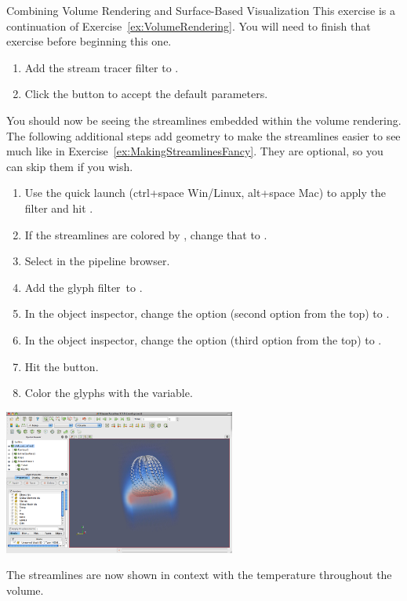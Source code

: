 \begin{exercise}{Combining Volume Rendering and Surface-Based Visualization}
  \label{ex:CombiningVolumeAndSurfaceRendering}%
  This exercise is a continuation of Exercise~\ref{ex:VolumeRendering}.
  You will need to finish that exercise before beginning this one.

  \begin{enumerate}
  \item Add the stream tracer filter \streamTracer to
    .
  \item Click the \apply button to accept the default parameters.
    \savecounter
  \end{enumerate}

  You should now be seeing the streamlines embedded within the volume
  rendering.  The following additional steps add geometry to make the
  streamlines easier to see much like in
  Exercise~\ref{ex:MakingStreamlinesFancy}.  They are optional, so you can
  skip them if you wish.

  \begin{enumerate}
    \restorecounter
  \item Use the quick launch (ctrl+space Win/Linux, alt+space Mac) to apply
    the  filter and hit \apply.
  \item If the streamlines are colored by , change that to
    .
  \item Select  in the pipeline browser.
  \item Add the glyph filter~\glyph to .
  \item In the object inspector, change the  option (second
    option from the top) to .
  \item In the object inspector, change the  option (third
    option from the top) to .
  \item Hit the \apply button.
  \item Color the glyphs with the  variable.
  \end{enumerate}

  \begin{inlinefig}
    \includegraphics[width=3in]{images/VolumeRender2}
  \end{inlinefig}

  The streamlines are now shown in context with the temperature throughout
  the volume.
\end{exercise}

